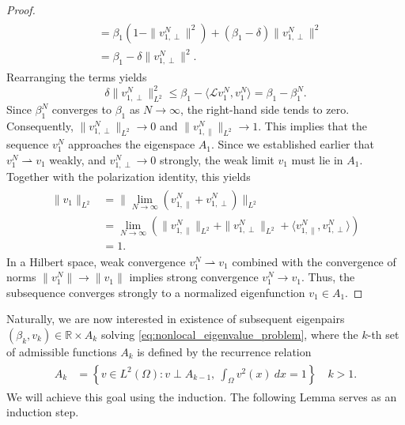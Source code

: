 \documentclass[11pt, a4paper]{article}
\theoremstyle{break}
\theoremstyle{break}
\theoremstyle{break}
\theoremstyle{break}
\theoremstyle{break}
\theoremstyle{break}
\theoremstyle{break}
\theoremstyle{break}
\theoremstyle{break}
\theoremstyle{break}
\begin{document}
\begin{proof}
\begin{align}
\begin{split}
            &= \beta_1 (1 - \|v_{1, \perp}^{N}\|^2) + (\beta_1 - \delta) \|v_{1, \perp}^{N}\|^2 \\
            &= \beta_1 - \delta \|v_{1, \perp}^{N}\|^2.
        \end{split}
    \end{align}
    Rearranging the terms yields
    \begin{equation}
        \delta \|v_{1, \perp}^{N}\|_{L^2}^2 \leq \beta_1 - \langle \mathcal{L} v_1^N, v_1^N \rangle = \beta_1 - \beta_1^N.
    \end{equation}
    Since $\beta_1^N$ converges to $\beta_1$ as $N \to \infty$, the right-hand side tends to zero. Consequently, $\|v_{1, \perp}^{N}\|_{L^2} \to 0$ and $\|v_{1, \parallel}^{N}\|_{L^2} \to 1$. This implies that the sequence $v_1^N$ approaches the eigenspace $A_1$.  Since we established earlier that $v_1^N \rightharpoonup v_1$ weakly, and $v_{1, \perp}^{N} \to 0$ strongly, the weak limit $v_1$ must lie in $A_1$. Together with the polarization identity, this yields
    \begin{align}
        \begin{split}
            \|v_1\|_{L^2} 
            &= 
            \|\lim_{N \to \infty} (v_{1, \parallel}^{N} + v_{1, \perp}^N)\|_{L^2} \\
            &=
            \lim_{N \to \infty} \left(\|v_{1, \parallel}^{N}\|_{L^2} + \| v_{1, \perp}^N\|_{L^2} + \langle v_{1, \parallel}^N, v_{1, \perp}^N \rangle \right) \\
            &=
            1.
        \end{split}
    \end{align}
    In a Hilbert space, weak convergence $v_1^N \rightharpoonup v_1$ combined with the convergence of norms $\|v_1^N\| \to \|v_1\|$ implies strong convergence $v_1^N \to v_1$. Thus, the subsequence converges strongly to a normalized eigenfunction $v_1 \in A_1$.
\end{proof}

Naturally, we are now interested in existence of subsequent eigenpairs $(\beta_k, v_k) \in \mathbb{R}\times A_k$ solving \eqref{eq:nonlocal_eigenvalue_problem}, where the $k$-th set of admissible functions $A_k$ is defined by the recurrence relation
\begin{align}
    \begin{split}
        A_k &= \left\{ v \in L^2(\Omega): v \perp A_{k-1}, \: \int_\Omega v^2(x) \: dx = 1 \right\} \quad k > 1.
    \end{split}
\end{align}
We will achieve this goal using the induction. The following Lemma serves as an induction step.
\end{document}
